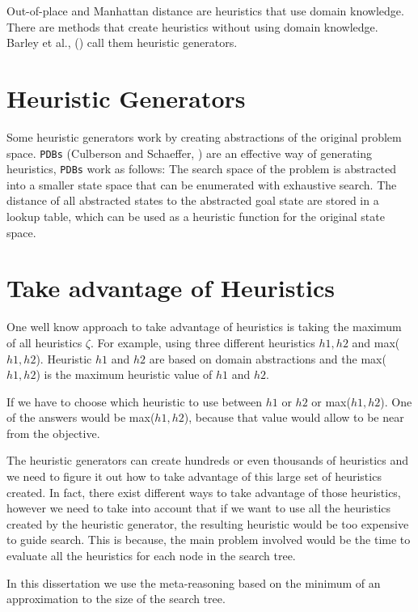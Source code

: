 Out-of-place and Manhattan distance are heuristics that use domain knowledge. There are methods that create heuristics without using domain knowledge. Barley et al., (\citeyear{BarleySantiagoOver}) call them heuristic generators.

\section{Heuristic Generators}
Some heuristic generators work by creating abstractions of the original problem space. \texttt{PDBs} (Culberson and Schaeffer, \citeyear{culberson1998pattern}) are an effective way of generating heuristics, \texttt{PDBs} work as follows: The search space of the problem is abstracted into a smaller state space that can be enumerated with exhaustive search. The distance of all abstracted states to the abstracted goal state are stored in a lookup table, which can be used as a heuristic function for the original state space.

\section{Take advantage of Heuristics}
One well know approach to take advantage of heuristics is taking the maximum of all heuristics $\zeta$. For example, using three different heuristics $h1, h2$ and max($h1, h2$). Heuristic $h1$ and $h2$ are based on domain abstractions and the max($h1, h2$) is the maximum heuristic value of $h1$ and $h2$.

If we have to choose which heuristic to use between $h1$ or $h2$ or max($h1, h2$). One of the answers would be max($h1, h2$), because that value would allow to be near from the objective.

The heuristic generators can create hundreds or even thousands of heuristics and we need to figure it out how to take advantage of this large set of heuristics created. In fact, there exist different ways to take advantage of those heuristics, however we need to take into account that if we want to use all the heuristics created by the heuristic generator, the resulting heuristic would be too expensive to guide search. This is because, the main problem involved would be the time to evaluate all the heuristics for each node in the search tree.

In this dissertation we use the meta-reasoning based on the minimum of an approximation to the size of the search tree.

